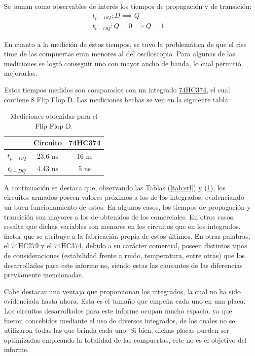 Se toman como observables de interés los tiempos de propagación y de transición:
\begin{equation*}
\begin{split}
	t_{p-DQ}: D \implies Q \\
	t_{t-DQ}: Q=0 \implies Q = 1
\end{split}
\end{equation*}
 
En cuanto a la medición de estos tiempos, se tuvo la problemática de que el rise time de las compuertas eran menores al del osciloscopio. Para algunas de las mediciones se logró conseguir uno con mayor ancho de banda, lo cual permitió mejorarlas.

Estos tiempos medidos son comparados con un integrado \href{https://pdf1.alldatasheet.com/datasheet-pdf/view/15593/PHILIPS/74HC374.html}{74HC374}, el cual contiene 8 Flip Flop D. Las mediciones hechas se ven en la siguiente tabla:
\begin{table}[H]
\centering
\begin{tabular}{ccc}
\hline
\textit{}                               & \textbf{Circuito}         & \textbf{74HC374}     \\ \hline
\textbf{$t_{p-DQ}$}                     & 23.6 ns                    & 16 ns                 \\
\textbf{$t_{t-DQ}$}                     & 4.43 ns                    & 5 ns                  \\
\hline
\end{tabular}
\caption{Mediciones obtenidas para el Flip Flop D.}
\label{tab:ffd}
\end{table}

A continuación se destaca que, observando las Tablas (\ref{tab:srl}) y (\ref{tab:ffd}), los circuitos armados poseen valores próximos a los de los integrados, evidenciando un buen funcionamiento de estos. En algunos casos, los tiempos de propagación y transición son mayores a los de obtenidos de los comerciales. En otros casos, resalta que dichas variables son menores en los circuitos que en los integrados, factor que se atribuye a la fabricación propia de estos últimos. En otras palabras, el 74HC279 y el 74HC374, debido a su carácter comercial, poseen distintos tipos de consideraciones (estabilidad frente a ruido, temperatura, entre otras) que los desarrollados para este informe no, siendo estas las causantes de las diferencias previamente mencionadas.

Cabe destacar una ventaja que proporcionan los integrados, la cual no ha sido evidenciada hasta ahora. Esta es el tamaño que empeña cada uno en una placa. Los circuitos desarrollados para este informe ocupan mucho espacio, ya que fueron concebidos mediante el uso de diversos integrados, de los cuales no se utilizaron todas las que brinda cada uno. Si bien, dichas placas pueden ser optimizadas empleando la totalidad de las compuertas, este no es el objetivo del informe.

